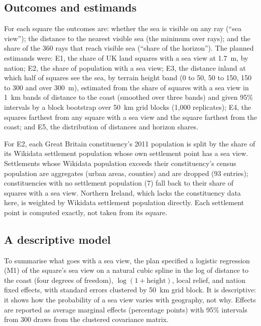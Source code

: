 \documentclass[11pt,a4paper]{article}
\begin{document}
\subsection{Outcomes and estimands}
For each square the outcomes are: whether the sea is visible on any ray (``sea view''); the distance to the nearest visible sea (the minimum over rays); and the share of the 360 rays that reach visible sea (``share of the horizon''). The planned estimands were: E1, the share of UK land squares with a sea view at 1.7~m, by nation; E2, the share of population with a sea view; E3, the distance inland at which half of squares see the sea, by terrain height band (0 to 50, 50 to 150, 150 to 300 and over 300~m), estimated from the share of squares with a sea view in 1~km bands of distance to the coast (smoothed over three bands) and given 95\% intervals by a block bootstrap over 50~km grid blocks (1,000 replicates); E4, the squares farthest from any square with a sea view and the square farthest from the coast; and E5, the distribution of distances and horizon shares.

For E2, each Great Britain constituency's 2011 population is split by the share of its Wikidata settlement population whose own settlement point has a sea view. Settlements whose Wikidata population exceeds their constituency's census population are aggregates (urban areas, counties) and are dropped (93 entries); constituencies with no settlement population (7) fall back to their share of squares with a sea view. Northern Ireland, which lacks the constituency data here, is weighted by Wikidata settlement population directly. Each settlement point is computed exactly, not taken from its square.

\subsection{A descriptive model}
To summarise what goes with a sea view, the plan specified a logistic regression (M1) of the square's sea view on a natural cubic spline in the log of distance to the coast (four degrees of freedom), $\log(1+\text{height})$, local relief, and nation fixed effects, with standard errors clustered by 50~km grid block. It is descriptive: it shows how the probability of a sea view varies with geography, not why. Effects are reported as average marginal effects (percentage points) with 95\% intervals from 300 draws from the clustered covariance matrix.
\end{document}
